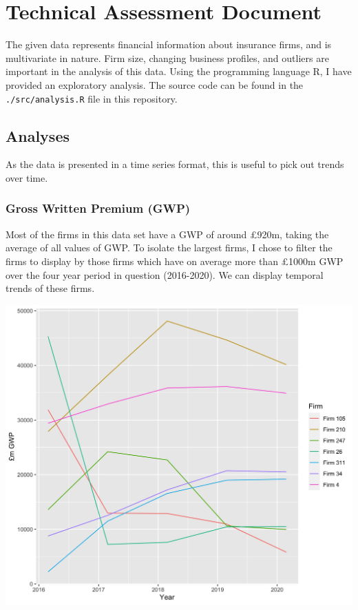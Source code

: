 \documentclass[
]{article}
\author{}
\date{\vspace{-2.5em}}
\begin{document}
\hypertarget{technical-assessment-document}{%
\section{Technical Assessment
Document}\label{technical-assessment-document}}

The given data represents financial information about insurance firms,
and is multivariate in nature. Firm size, changing business profiles,
and outliers are important in the analysis of this data. Using the
programming language R, I have provided an exploratory analysis. The
source code can be found in the \texttt{./src/analysis.R} file in this
repository.

\hypertarget{analyses}{%
\subsection{Analyses}\label{analyses}}

As the data is presented in a time series format, this is useful to pick
out trends over time.

\hypertarget{gross-written-premium-gwp}{%
\subsubsection{Gross Written Premium
(GWP)}\label{gross-written-premium-gwp}}

Most of the firms in this data set have a GWP of around £920m, taking
the average of all values of GWP. To isolate the largest firms, I chose
to filter the firms to display by those firms which have on average more
than £1000m GWP over the four year period in question (2016-2020). We
can display temporal trends of these firms.

\includegraphics[width=1\linewidth]{../figs/gwp_plot_avg_10000}
\end{document}
